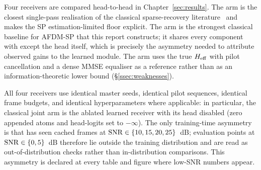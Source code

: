 Four receivers are compared head-to-head in Chapter~\ref{sec:results}. The \Serial{} arm is the closest single-pass realisation of the classical sparse-recovery literature~\cite{tropp2007signal,berger2010uwasparse} and makes the SP estimation-limited floor explicit. The \ClassicalJoint{} arm is the strongest classical baseline for AFDM-SP that this report constructs; it shares every component with \LearnedHead{} except the head itself, which is precisely the asymmetry needed to attribute observed gains to the learned module. The \Oracle{} arm uses the true $H_{\mathrm{eff}}$ with pilot cancellation and a dense MMSE equaliser as a reference rather than as an information-theoretic lower bound (\S\ref{ssec:weaknesses}).

All four receivers use identical master seeds, identical pilot sequences, identical frame budgets, and identical hyperparameters where applicable: in particular, the classical joint arm is the ablated learned receiver with its head disabled (zero appended atoms and head-logits set to $-\infty$). The only training-time asymmetry is that \LearnedHead{} has seen cached frames at $\mathrm{SNR} \in \{10, 15, 20, 25\}$~dB; evaluation points at $\mathrm{SNR} \in \{0, 5\}$~dB therefore lie outside the training distribution and are read as out-of-distribution checks rather than in-distribution comparisons. This asymmetry is declared at every table and figure where low-SNR numbers appear.
